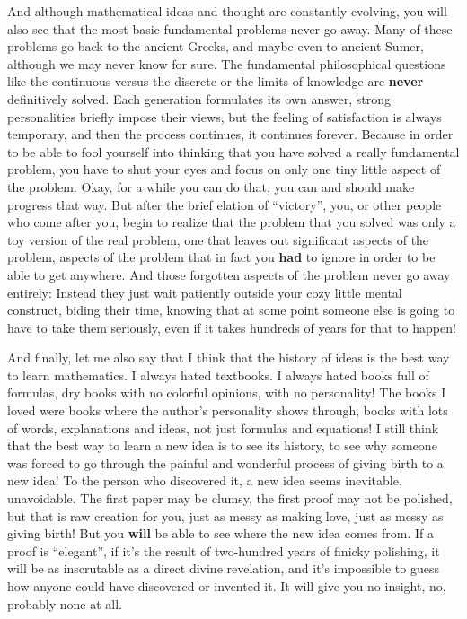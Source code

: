 \documentclass[12pt]{book}
\begin{document}
And although mathematical ideas and thought are constantly evolving, you will also see
that the most basic fundamental problems never go away. Many of these problems go back to
the ancient Greeks, and maybe even to ancient Sumer, although we may never know for sure.
The fundamental philosophical questions like the continuous versus the discrete or the limits of knowledge
are \textbf{never} definitively solved. Each generation formulates its own answer,
strong personalities briefly impose their views, but the feeling of satisfaction is always temporary, 
and then the process continues, it continues forever.  Because in order to be able to fool
yourself into thinking that you have solved a really fundamental problem, you have to shut your
eyes and focus on only one tiny little aspect of the problem.
Okay, for a while you can do that, you can and should make progress that way.  
But after the brief elation of ``victory'', you, or other people who come after you, 
begin to realize that the
problem that you solved was only a toy version of the real problem, one that leaves out
significant aspects of the problem, 
aspects of the problem that in fact you \textbf{had} to ignore in order to be able to get anywhere. 
And those forgotten aspects of the problem never go away entirely: 
Instead they just wait patiently outside your cozy little mental construct, biding their time,
knowing that at some point someone else is going to have to take them seriously, even if it takes
hundreds of years for that to happen!

And finally, let me also say that I think that the history of ideas is the best way
to learn mathematics.  I always hated textbooks.  I always hated books full of formulas,
dry books with no colorful opinions, with no personality! The books I loved were books where
the author's personality shows through, books with lots of words, explanations and ideas, not
just formulas and equations!  I still think that the best way to learn a new idea is to see
its history, to see why someone was forced to go through the painful and wonderful process of
giving birth to a new idea!  To the person who discovered it, a new idea seems inevitable,
unavoidable.  The first paper may be clumsy, the first proof may not be polished, but that is raw
creation for you, just as messy as making love, just as messy as giving birth!
But you \textbf{will} be able to see where the new idea comes from.
If a proof is ``elegant'', if it's the result of two-hundred years of finicky polishing, 
it will be as inscrutable as a direct divine revelation, and it's impossible to guess how
anyone could have discovered or invented it. It will give you no insight, no, probably none at all.  
\end{document}
